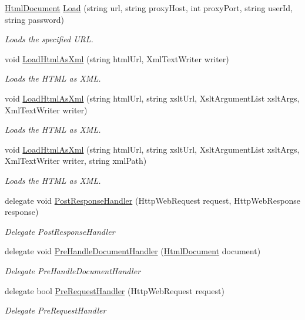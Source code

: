 \begin{DoxyCompactItemize}
\hyperlink{class_html_agility_pack_1_1_html_document}{Html\+Document} \hyperlink{class_html_agility_pack_1_1_html_web_a0c4d65827cb2e99af92e97a1b60dcb5f}{Load} (string url, string proxy\+Host, int proxy\+Port, string user\+Id, string password)
\begin{DoxyCompactList}\small\item\em Loads the specified U\+RL. \end{DoxyCompactList}\item 
void \hyperlink{class_html_agility_pack_1_1_html_web_ad8ef0d1d7a4e6997a29cea1eea467294}{Load\+Html\+As\+Xml} (string html\+Url, Xml\+Text\+Writer writer)
\begin{DoxyCompactList}\small\item\em Loads the H\+T\+ML as X\+ML. \end{DoxyCompactList}\item 
void \hyperlink{class_html_agility_pack_1_1_html_web_a94d1cbc45abd329ced10f5eae232bab6}{Load\+Html\+As\+Xml} (string html\+Url, string xslt\+Url, Xslt\+Argument\+List xslt\+Args, Xml\+Text\+Writer writer)
\begin{DoxyCompactList}\small\item\em Loads the H\+T\+ML as X\+ML. \end{DoxyCompactList}\item 
void \hyperlink{class_html_agility_pack_1_1_html_web_aefb59d8fafb367664cfddf6b00532030}{Load\+Html\+As\+Xml} (string html\+Url, string xslt\+Url, Xslt\+Argument\+List xslt\+Args, Xml\+Text\+Writer writer, string xml\+Path)
\begin{DoxyCompactList}\small\item\em Loads the H\+T\+ML as X\+ML. \end{DoxyCompactList}\item 
delegate void \hyperlink{class_html_agility_pack_1_1_html_web_ad1e916ff2a7d0208601048ba15c2de45}{Post\+Response\+Handler} (Http\+Web\+Request request, Http\+Web\+Response response)
\begin{DoxyCompactList}\small\item\em Delegate Post\+Response\+Handler \end{DoxyCompactList}\item 
delegate void \hyperlink{class_html_agility_pack_1_1_html_web_a04fb9c8f6dd4672c86fcb4021008f64e}{Pre\+Handle\+Document\+Handler} (\hyperlink{class_html_agility_pack_1_1_html_document}{Html\+Document} document)
\begin{DoxyCompactList}\small\item\em Delegate Pre\+Handle\+Document\+Handler \end{DoxyCompactList}\item 
delegate bool \hyperlink{class_html_agility_pack_1_1_html_web_a114ad10087064af08de4d4293847ef30}{Pre\+Request\+Handler} (Http\+Web\+Request request)
\begin{DoxyCompactList}\small\item\em Delegate Pre\+Request\+Handler \end{DoxyCompactList}\end{DoxyCompactItemize}
